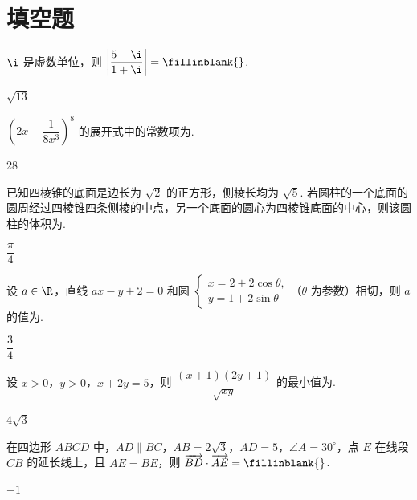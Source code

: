 \section{填空题}

\begin{problem}
\( \i \) 是虚数单位，则 \( \left| \dfrac{5-\i}{1+\i} \right|=\fillinblank{} \).
\begin{answer}
\(\sqrt{13}\)
\end{answer}
\end{problem}



\begin{problem}
\( \left( 2x-\dfrac{1}{8x^3} \right)^8 \) 的展开式中的常数项为\fillinblank{}.
\begin{answer}
28
\end{answer}
\end{problem}



\begin{problem}
已知四棱锥的底面是边长为 \( \sqrt2 \) 的正方形，侧棱长均为 \( \sqrt5 \). 若圆柱的一个底面的圆周经过四棱锥四条侧棱的中点，另一个底面的圆心为四棱锥底面的中心，则该圆柱的体积为\fillinblank{}.
\begin{answer}
\(\dfrac{\pi}{4}\)
\end{answer}
\end{problem}



\begin{problem}
设 \( a\in \R \)，直线 \( ax-y+2=0 \) 和圆 \( \begin{cases}
x=2+2\cos\theta,\\
y=1+2\sin\theta
\end{cases} \)（\( \theta \) 为参数）相切，则 \( a \) 的值为\fillinblank{}.
\begin{answer}
\(\dfrac34\)
\end{answer}
\end{problem}



\begin{problem}
设 \( x>0 \)，\( y>0 \)，\( x+2y=5 \)，则 \( \dfrac{(x+1)(2y+1)}{\sqrt{xy}} \) 的最小值为\fillinblank{}.
\begin{answer}
\(4\sqrt3\)
\end{answer}
\end{problem}



\begin{problem}
在四边形 \(ABCD\) 中，\( AD\parallel BC \)，\( AB=2\sqrt3 \)，\( AD=5 \)，\( \angle A=30^\circ \)，点 \(E\) 在线段 \(CB\) 的延长线上，且 \( AE=BE \)，则 \( \overrightarrow{BD}\cdot \overrightarrow{AE}=\fillinblank{} \).

\begingroup
{}
\endgroup
\FloatBarrier
\begin{answer}
\(-1\)
\end{answer}
\end{problem}


